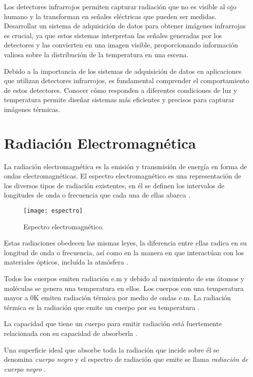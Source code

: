 Los detectores infrarrojos permiten capturar radiación que no es visible al ojo humano y la transforman en señales eléctricas que pueden ser medidas. Desarrollar un sistema de adquisición de datos para obtener imágenes infrarrojas es crucial, ya que estos sistemas interpretan las señales generadas por los detectores y las convierten en una imagen visible, proporcionando información valiosa sobre la distribución de la temperatura en una escena.


Debido a la importancia de los sistemas de adquisición de datos en aplicaciones que utilizan detectores infrarrojos, es fundamental comprender el comportamiento de estos detectores. Conocer cómo responden a diferentes condiciones de luz y temperatura permite diseñar sistemas más eficientes y precisos para capturar imágenes térmicas.
    
    \section{Radiación Electromagnética}
    La radiación electromagnética es la emisión y transmisión de energía en forma de ondas electromagnéticas. El espectro electromagnético es una representación de los diversos tipos de radiación existentes, en él se definen los intervalos de longitudes de onda o frecuencia que cada una de ellas abarca \cite{Chang}.
            \begin{figure}[hbtp]
                \centering
                \texttt{[image: espectro]}
                \caption{Espectro electromagnético.}
                \label{fig:espectro}
            \end{figure}    
    
    Estas radiaciones obedecen las mismas leyes, la diferencia entre ellas radica en su longitud de onda o frecuencia, así como en la manera en que interactúan con los materiales ópticos, incluída la atmósfera \cite{Vincent}.
    
    Todos los cuerpos emiten radiación e.m  y debido al movimiento de sus átomos y moléculas se genera una temperatura en ellos. Los cuerpos con una temperatura mayor a 0K emiten radiación térmica por medio de ondas e.m. La radiación térmica es la radiación que emite un cuerpo por su temperatura \cite{Hollands}.
    
    La capacidad que tiene un cuerpo para emitir radiación está fuertemente relacionada con su capacidad de absorberla \cite{Beiser}.
    
    Una superficie ideal que absorbe toda la radiación que incide sobre él se denomina \textit{cuerpo negro} y el espectro de radiación que emite se llama \textit{radiación de cuerpo negro} \cite{Sears}.
    
